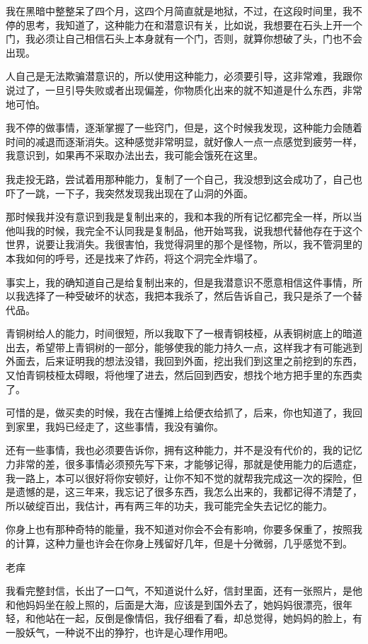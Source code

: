 我在黑暗中整整呆了四个月，这四个月简直就是地狱，不过，在这段时间里，我不停的思考，我知道了，这种能力在和潜意识有关，比如说，我想要在石头上开一个门，我必须让自己相信石头上本身就有一个门，否则，就算你想破了头，门也不会出现。

人自己是无法欺骗潜意识的，所以使用这种能力，必须要引导，这非常难，我跟你说过了，一旦引导失败或者出现偏差，你物质化出来的就不知道是什么东西，非常地可怕。

我不停的做事情，逐渐掌握了一些窍门，但是，这个时候我发现，这种能力会随着时间的减退而逐渐消失。这种感觉非常明显，就好像人一点一点感觉到疲劳一样，我意识到，如果再不采取办法出去，我可能会饿死在这里。

我走投无路，尝试着用那种能力，复制了一个自己，我没想到这会成功了，自己也吓了一跳，一下子，我突然发现我出现在了山洞的外面。

那时候我并没有意识到我是复制出来的，我和本我的所有记忆都完全一样，所以当他叫我的时候，我完全不认同我是复制品，他开始骂我，说我想代替他存在于这个世界，说要让我消失。我很害怕，我觉得洞里的那个是怪物，所以，我不管洞里的本我如何的呼号，还是找来了炸药，将这个洞完全炸塌了。

事实上，我的确知道自己是给复制出来的，但是我潜意识不愿意相信这件事情，所以我选择了一种受破坏的状态，我把本我杀了，然后告诉自己，我只是杀了一个替代品。

青铜树给人的能力，时间很短，所以我取下了一根青铜枝桠，从表铜树底上的暗道出去，希望带上青铜树的一部分，能够使我的能力持久一点，这样我才有可能逃到外面去，后来证明我的想法没错，我回到外面，挖出我们到这里之前挖到的东西，又怕青铜枝桠太碍眼，将他埋了进去，然后回到西安，想找个地方把手里的东西卖了。

可惜的是，做买卖的时候，我在古懂摊上给便衣给抓了，后来，你也知道了，我回到家里，我妈已经走了，这些事情，我没有骗你。

还有一些事情，我也必须要告诉你，拥有这种能力，并不是没有代价的，我的记忆力非常的差，很多事情必须预先写下来，才能够记得，那就是使用能力的后遗症，我一路上，本可以很好将你安顿好，让你不知不觉的就帮我完成这一次的探险，但是遗憾的是，这三年来，我忘记了很多东西，我怎么出来的，我都记得不清楚了，所以破绽百出，我估计，再有两三年的功夫，我可能完全失去记忆的能力。

你身上也有那种奇特的能量，我不知道对你会不会有影响，你要多保重了，按照我的计算，这种力量也许会在你身上残留好几年，但是十分微弱，几乎感觉不到。

老痒

我看完整封信，长出了一口气，不知道说什么好，信封里面，还有一张照片，是他和他妈妈坐在般上照的，后面是大海，应该是到国外去了，她妈妈很漂亮，很年轻，和他站在一起，反倒是像情侣，我仔细看了看，却总觉得，她妈妈的脸上，有一股妖气，一种说不出的狰狞，也许是心理作用吧。

